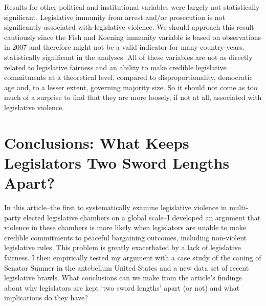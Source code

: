 \documentclass[a4paper]{article}\usepackage[]{graphicx}\usepackage[]{color}
\begin{document}
Results for other political and institutional variables were largely not statistically significant. Legislative immunity from arrest and/or prosecution is not significantly associated with legislative violence. We should approach this result cautiously since the Fish and Koening immunity variable is based on observations in 2007 and therefore might not be a valid indicator for many country-years.   statistically significant in the analyses.  All of these variables are not as directly related to legislative fairness and an ability to make credible legislative commitments at a theoretical level, compared to disproportionality, democratic age and, to a lesser extent, governing majority size. So it should not come as too much of a surprise to find that they are more loosely, if not at all, associated with legislative violence.

\section*{Conclusions: What Keeps Legislators Two Sword Lengths Apart?}

In this article--the first to systematically examine legislative violence in multi-party elected legislative chambers on a global scale--I developed an argument that violence in these chambers is more likely when legislators are unable to make credible commitments to peaceful bargaining outcomes, including non-violent legislative rules. This problem is greatly exacerbated by a lack of legislative fairness. I then empirically tested my argument with a case study of the caning of Senator Sumner in the antebellum United States and a new data set of recent legislative brawls. What conclusions can we make from the article's findings about why legislators are kept `two sword lengths' apart (or not) and what implications do they have?
\end{document}
